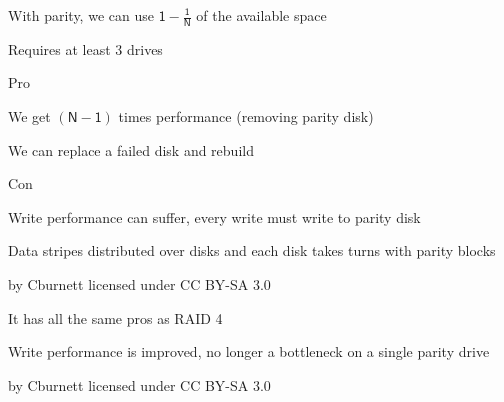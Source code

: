 \begin{slide}
  

  With parity, we can use $\mathsf{1 - \frac{1}{N}}$ of the available space

  \leftspace{}Requires at least 3 drives
  \medskip

  Pro

  \leftspace{}We get $\mathsf{(N - 1)}$ times performance
               (removing parity disk)

  \leftspace{}We can replace a failed disk and rebuild
  \medskip

  Con

  \leftspace{}Write performance can suffer, every write must write to parity
               disk

\end{slide}

\begin{slide}
  

  Data stripes distributed over disks and each disk takes turns with parity
  blocks

  \begin{center}
    
  \end{center}

  \begin{flushright}
    by Cburnett licensed under CC BY-SA 3.0
  \end{flushright}

\end{slide}

\begin{slide}
  

  It has all the same pros as RAID 4
  \medskip

  Write performance is improved, no longer a bottleneck on a single parity
  drive

\end{slide}

\begin{slide}
  

  \begin{center}
    
  \end{center}

  \begin{flushright}
    by Cburnett licensed under CC BY-SA 3.0
  \end{flushright}

\end{slide}

